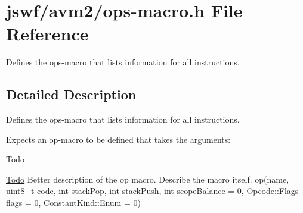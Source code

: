 \hypertarget{ops-macro_8h}{\section{jswf/avm2/ops-\/macro.h File Reference}
\label{ops-macro_8h}
}


Defines the {\ttfamily ops}-\/macro that lists information for all instructions.  




\subsection{Detailed Description}
Defines the {\ttfamily ops}-\/macro that lists information for all instructions. 

Expects an {\ttfamily op}-\/macro to be defined that takes the arguments\+: \begin{DoxyRefDesc}{Todo}
\item[\hyperlink{todo__todo000008}{Todo}]Better description of the op macro. Describe the macro itself. {\ttfamily op(name, uint8\+\_\+t code, int stack\+Pop, int stack\+Push, int scope\+Balance = 0, Opcode\+::\+Flags flags = 0, Constant\+Kind\+::\+Enum = 0)} \end{DoxyRefDesc}
